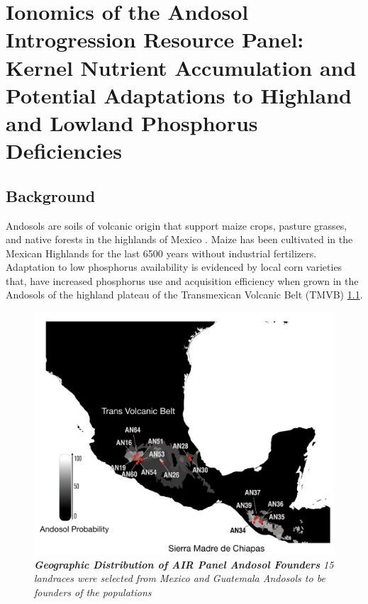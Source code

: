 \chapter{Ionomics of the Andosol Introgression Resource Panel: Kernel Nutrient Accumulation and Potential Adaptations to Highland and Lowland Phosphorus Deficiencies}
\label{chap-three}

\newrefsection

\section{Background}
Andosols are soils of volcanic origin that support maize crops, pasture grasses, and native forests in the highlands of Mexico \citep{bayuelo-jimenez2020,galvan-tejada2014}. Maize has been cultivated in the Mexican Highlands for the last 6500 years \citep{piperno2001} without industrial fertilizers.
Adaptation to low phosphorus availability is evidenced by local corn varieties that, have increased phosphorus use and acquisition efficiency when grown in the Andosols of the highland plateau of the Transmexican Volcanic Belt (TMVB) \citep{bayuelo-jimenez2011,bayuelo-jimenez2014} \ref{fig::parentmap}.

\begin{figure}[!ht]
\includegraphics[width=\linewidth]{Chapter-4/figs/parentmap.png}
\caption[ Geographic Distribution of AIR Panel Andosol Founders]
\textit{{\textbf{Geographic Distribution of AIR Panel Andosol Founders }}
15 landraces were selected from Mexico and Guatemala Andosols to be founders of the populations}
\label{fig::parentmap}
\end{figure}

